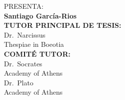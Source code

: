 \documentclass[
]{article}
\begin{document}
\begin{titlepage}
\begin{center}
        {\large PRESENTA:}\\[0.3cm]
        {\LARGE \textbf{Santiago García-Rios}}\\[1.0cm]
        
        {\small \textbf{TUTOR PRINCIPAL DE TESIS:}}\\
        {\small  Dr.~Narcissus }\\
        {\small  Thespiae in Boeotia }\\[0.5cm]
        
        {\small \textbf{COMITÉ TUTOR:}}\\
        {\small  Dr.~Socrates }\\
        {\small  Academy of Athens }\\[0.3cm]
        {\small  Dr.~Plato }\\
        {\small  Academy of Athens }\\[1cm]
        
    \end{center}
\end{titlepage}


\newpage
\begin{center}
\end{center}

\newpage
\begin{center}
\end{center}
\end{document}
